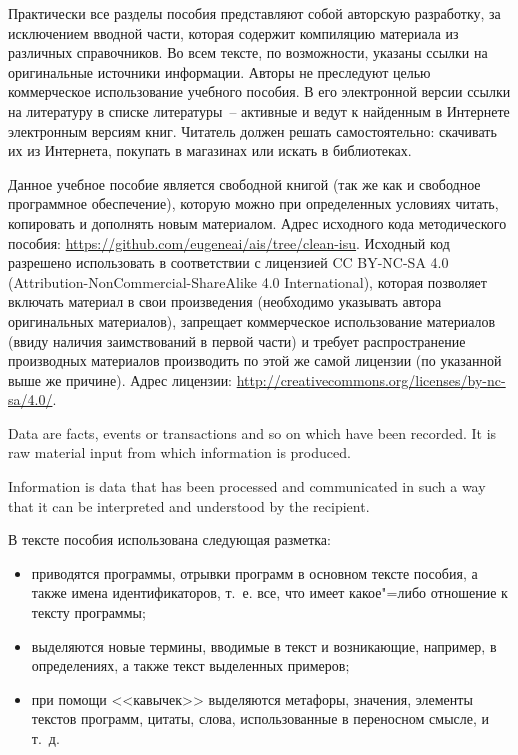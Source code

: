 \documentclass[a4paper,14pt, openany, twoside, draft]{extbook} %
\begin{document}
Практически все разделы пособия представляют собой авторскую разработку, за исключением вводной части, которая содержит компиляцию материала из различных справочников.  Во всем тексте, по возможности, указаны ссылки на оригинальные источники информации.  Авторы не преследуют целью коммерческое использование учебного пособия.  В его электронной версии ссылки на литературу в списке литературы~-- активные и ведут к найденным в Интернете электронным версиям книг.  Читатель должен решать самостоятельно: скачивать их из Интернета, покупать в магазинах или искать в библиотеках.

Данное учебное пособие является свободной книгой (так же как и свободное программное обеспечение), которую можно при определенных условиях читать, копировать и дополнять новым материалом. Адрес исходного кода методического пособия: \url{https://github.com/eugeneai/ais/tree/clean-isu}. Исходный код разрешено использовать в соответствии с лицензией \foreignlanguage{english}{CC BY-NC-SA 4.0 (Attribution-NonCommercial-ShareAlike 4.0 International)}, которая позволяет включать материал в свои произведения (необходимо указывать автора оригинальных материалов), запрещает коммерческое использование материалов (ввиду наличия заимствований в первой части) и требует распространение производных материалов производить по этой же самой лицензии (по указанной выше же причине). Адрес лицензии: \url{http://creativecommons.org/licenses/by-nc-sa/4.0/}.

\begin{description}[style=unboxed,leftmargin=0cm]
\item[A)] Data are facts, events or transactions and so on which have been recorded.
               It is raw material input from which information is produced.
\item[Some labels are pretty long] Information is data that has been processed and communicated in such
               a way that it can be interpreted and understood by the recipient.
\end{description}

В тексте пособия использована следующая разметка:
\begin{itemize}
\item{} {} приводятся программы, отрывки программ в основном тексте пособия, а также имена идентификаторов, т.~е. все, что имеет какое"=либо отношение к тексту программы;
\item{} {} выделяются новые термины, вводимые в текст и возникающие, например, в определениях, а также текст выделенных примеров;
\item{} {\normalfont при помощи <<кавычек>>} выделяются метафоры, значения, элементы текстов программ, цитаты, слова, использованные в переносном смысле, и т.~д.
\end{itemize}
\end{document}
